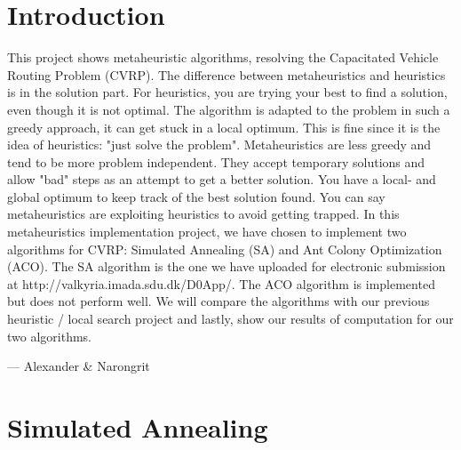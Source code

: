 \documentclass[12pt]{article}
\begin{document}

\tableofcontents
\pagebreak


\section{Introduction}

This project shows metaheuristic algorithms, resolving the Capacitated Vehicle Routing Problem (CVRP). The difference between metaheuristics and heuristics is in 
the solution part. For heuristics, you are trying your best to find a solution, even though it is not optimal. The algorithm is adapted to the problem
in such a greedy approach, it can get stuck in a local optimum. This is fine since it is the idea of heuristics: "just solve the problem". 
\newline
Metaheuristics are less greedy and tend to be more problem independent. They accept temporary solutions and allow "bad" steps as an attempt to get
a better solution. You have a local- and global optimum to keep track of the best solution found. You can say metaheuristics are exploiting
heuristics to avoid getting trapped. 
\newline
In this metaheuristics implementation project, we have chosen to implement two algorithms for CVRP: Simulated Annealing (SA) and Ant Colony Optimization (ACO). 
The SA algorithm is the one we have uploaded for electronic submission at http://valkyria.imada.sdu.dk/D0App/. The ACO algorithm is implemented but does not perform well.
We will compare the algorithms with our previous heuristic / local search project and lastly, show our results of computation for our two algorithms.

\hspace{1 cm}--- Alexander \& Narongrit

\newpage

\section{Simulated Annealing} 
\end{document}
